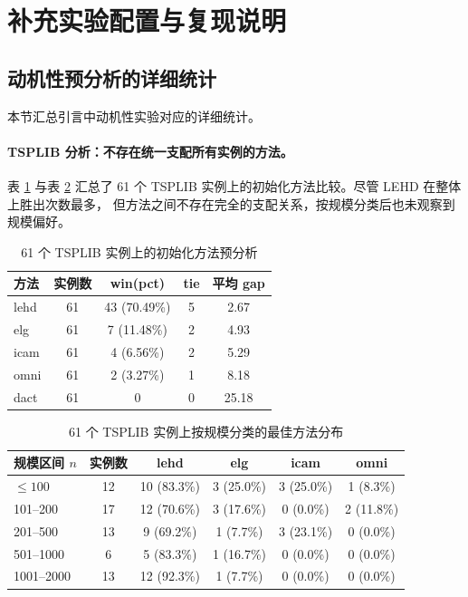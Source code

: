 
\section{补充实验配置与复现说明}

\subsection{动机性预分析的详细统计}

本节汇总引言中动机性实验对应的详细统计。

\paragraph{TSPLIB 分析：不存在统一支配所有实例的方法。}
表 \ref{tab:motivation-tsplib-overall} 与表 \ref{tab:motivation-tsplib-by-size} 
汇总了 61 个 TSPLIB 实例上的初始化方法比较。尽管 LEHD 在整体上胜出次数最多，
但方法之间不存在完全的支配关系，按规模分类后也未观察到规模偏好。

\begin{table}[htb]
  \centering
  \caption{61 个 TSPLIB 实例上的初始化方法预分析}
  \label{tab:motivation-tsplib-overall}
  \small
  \begin{tabular}{lcccc}
    \toprule
    方法 & 实例数 & win(pct) & tie & 平均 gap \\
    \midrule
    lehd & 61 & 43 (70.49\%) & 5 & 2.67 \\
    elg  & 61 & 7 (11.48\%)  & 2 & 4.93 \\
    icam & 61 & 4 (6.56\%)   & 2 & 5.29 \\
    omni & 61 & 2 (3.27\%)   & 1 & 8.18 \\
    dact & 61 & 0            & 0 & 25.18 \\
    \bottomrule
  \end{tabular}
\end{table}

\begin{table}[htb]
  \centering
  \caption{61 个 TSPLIB 实例上按规模分类的最佳方法分布}
  \label{tab:motivation-tsplib-by-size}
  \small
  \begin{tabular}{lccccc}
    \toprule
    规模区间 $n$ & 实例数 & lehd & elg & icam & omni \\
    \midrule
    $\leq 100$     & 12 & 10 (83.3\%) & 3 (25.0\%) & 3 (25.0\%) & 1 (8.3\%) \\
    101--200       & 17 & 12 (70.6\%) & 3 (17.6\%) & 0 (0.0\%)  & 2 (11.8\%) \\
    201--500       & 13 & 9 (69.2\%)  & 1 (7.7\%)  & 3 (23.1\%) & 0 (0.0\%)  \\
    501--1000      & 6  & 5 (83.3\%)  & 1 (16.7\%) & 0 (0.0\%)  & 0 (0.0\%)  \\
    1001--2000     & 13 & 12 (92.3\%) & 1 (7.7\%)  & 0 (0.0\%)  & 0 (0.0\%)  \\
    \bottomrule
  \end{tabular}
\end{table}

